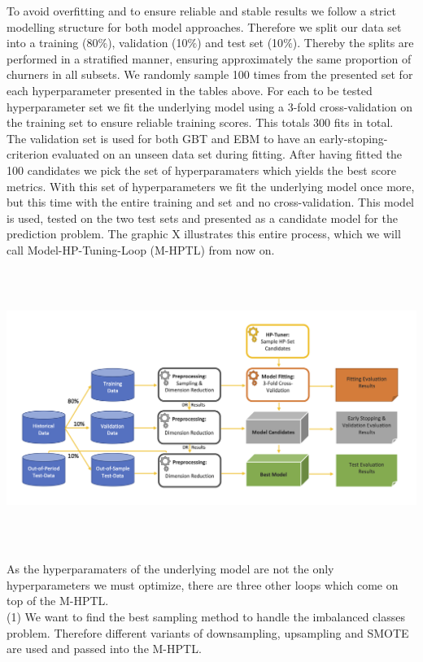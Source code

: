 \documentclass[12pt,titlepage]{article}
\begin{document}
To avoid overfitting and to ensure reliable and stable results we follow a strict modelling structure for both model approaches. Therefore we split our data set into a training (80$\%$), validation (10$\%$) and test set (10$\%$). Thereby the splits are performed in a stratified manner, ensuring approximately the same proportion of churners in all subsets. We randomly sample 100 times from the presented set for each hyperparameter presented in the tables above. For each to be tested hyperparameter set we fit the underlying model using a 3-fold cross-validation on the training set to ensure reliable training scores. This totals 300 fits in total. \\
The validation set is used for both GBT and EBM to have an early-stoping-criterion evaluated on an unseen data set during fitting. After having fitted the 100 candidates we pick the set of hyperparamaters which yields the best score metrics. With this set of hyperparameters we fit the underlying model once more, but this time with the entire training and set and no cross-validation. This model is used, tested on the two test sets and presented as a candidate model for the prediction problem. The graphic X illustrates this entire process, which we will call Model-HP-Tuning-Loop (M-HPTL) from now on. \\
\centerline{\includegraphics[height=9cm]{fitting_tuning_viz.png}}
As the hyperparamaters of the underlying model are not the only hyperparameters we must optimize, there are three other loops which come on top of the M-HPTL. \\
(1) We want to find the best sampling method to handle the imbalanced classes problem. Therefore different variants of downsampling, upsampling and SMOTE are used and passed into the M-HPTL. \\
\end{document}
